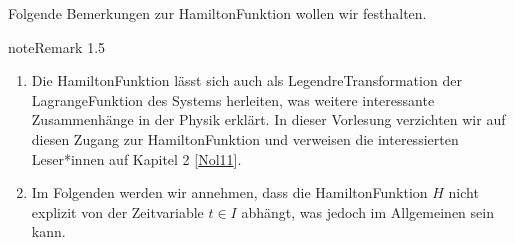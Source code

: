 \documentclass[letterpaper,10pt,german]{jupyterBook}
\begin{document}
\sphinxAtStartPar
Folgende Bemerkungen zur Hamilton\sphinxhyphen{}Funktion wollen wir festhalten.
\label{ode/hamilton:remark-1}
\begin{sphinxadmonition}{note}{Remark 1.5}


\begin{enumerate}
%
\item {} 
\sphinxAtStartPar
Die Hamilton\sphinxhyphen{}Funktion lässt sich auch als Legendre\sphinxhyphen{}Transformation der Lagrange\sphinxhyphen{}Funktion des Systems herleiten, was weitere interessante Zusammenhänge in der Physik erklärt.
In dieser Vorlesung verzichten wir auf diesen Zugang zur Hamilton\sphinxhyphen{}Funktion und verweisen die interessierten Leser*innen auf Kapitel 2 {[}\hyperlink{cite.references:id11}{Nol11}{]}.

\item {} 
\sphinxAtStartPar
Im Folgenden werden wir annehmen, dass die Hamilton\sphinxhyphen{}Funktion \(H\) nicht explizit von der Zeitvariable \(t \in I\) abhängt, was jedoch im Allgemeinen sein kann.

\end{enumerate}
\end{sphinxadmonition}
\end{document}
